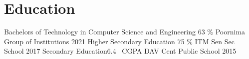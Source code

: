 \section{Education}
  \resumeSubHeadingListStart
    \resumeSubheading
      {Bachelors of Technology in Computer Science and Engineering }{63 \%}
      {Poornima Group of Institutions }{2021}
    \resumeSubheading
      {Higher Secondary Education }{75 \%}
      {ITM Sen Sec School }{ 2017}
    \resumeSubheading
      {Secondary Education}{6.4 \ CGPA}
      {DAV Cent Public School }{2015}
  \resumeSubHeadingListEnd







 